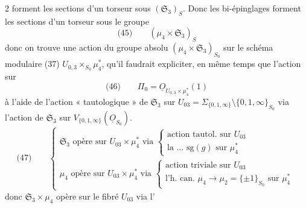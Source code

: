 \documentclass[11pt,a4paper]{article}
\begin{document}
2 forment les sections d'un torseur sous $(\mathfrak{S}_3)_S$. Donc les
bi-épinglages forment les sections d'un torseur sous le groupe
\[
  \text{(45)} \qquad (\mu_4 \times \mathfrak{S}_3)_S
\]
donc on trouve une action  du groupe absolu
$(\mu_4 \times \mathfrak{S}_3)_{S_0}$ sur \struck{\ill{}} le schéma modulaire (37)
$U_{0,3} \times_{S_0} \mu_4^{*}$, qu'il faudrait expliciter, en même temps que
l'action sur
\[
  \text{(46)} \qquad \Pi_0 = \underline{O}_{U_{0,3} \times \mu_4^{*}}(1)
\]
à l'aide de l'action « tautologique » de $\mathfrak{S}_3$ sur
$U_{03} = \Sigma_{\{0,1,\infty\}} \setminus \{0,1,\infty\}_{S_0}$ via
l'action de $\mathfrak{S}_3$ sur $V_{\{0,1,\infty\}}(\underline{O}_{S_0})$.
\[
  \text{(47)} \qquad
  \begin{cases}
    \mathfrak{S}_3 \text{ opère sur } U_{03} \times \mu_4^{*} \text{ via }
    \begin{cases}
      \text{action tautol.\ sur } U_{03} \\
      \text{la \ldots\ } \mathrm{sg}(g) \text{ sur } \mu_4^{*}
    \end{cases} \\[10pt]
    \mu_4 \text{ opère sur } U_{03} \times \mu_4^{*} \text{ via }
    \begin{cases}
      \text{action triviale sur } U_{03} \\
      \text{l'h.\ can.\ } \mu_4 \to \mu_2 = \{\pm 1\}_{S_0} \text{ sur } \mu_4^{*}
    \end{cases}
  \end{cases}
\]
donc $\mathfrak{S}_3 \times \mu_4$ opère sur le fibré $U_{03}$ via l'
\end{document}
